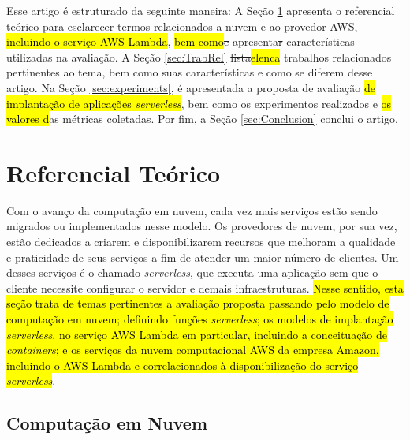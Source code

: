 \documentclass[10pt,conference]{IEEEtran}
\begin{document}
Esse artigo é estruturado da seguinte maneira: A Seção \ref{sec:RefTeo} apresenta o referencial teórico para esclarecer termos relacionados a nuvem e ao provedor AWS, \hl{incluindo o serviço AWS Lambda}, \hl{bem como}\st{e} apresenta\st{r} características utilizadas na avaliação. A Seção \ref{sec:TrabRel} \st{lista}\hl{elenca} trabalhos relacionados pertinentes ao tema, bem como suas características e como se diferem desse artigo. Na Seção \ref{sec:experiments}, é apresentada a proposta de avaliação \hl{de implantação de aplicações \textit{serverless}}, bem como os experimentos realizados e \hl{os valores d}as métricas coletadas. Por fim, a Seção \ref{sec:Conclusion} conclui o artigo.

\section{Referencial Teórico} 
\label{sec:RefTeo}

Com o avanço da computação em nuvem, cada vez mais serviços estão sendo migrados ou implementados nesse modelo. Os provedores de nuvem, por sua vez, estão dedicados a criarem e disponibilizarem recursos que melhoram a qualidade e praticidade de seus serviços a fim de atender um maior número de clientes. Um desses serviços é o chamado \textit{serverless}, que executa uma aplicação sem que o cliente necessite configurar o servidor e demais infraestruturas. \hl{Nesse sentido, esta seção trata de temas pertinentes a avaliação proposta passando pelo modelo de computação em nuvem; definindo funções \textit{serverless}; os modelos de implantação \textit{serverless}, no serviço AWS Lambda em particular, incluindo a conceituação de \textit{containers}; e os serviços da nuvem computacional AWS da empresa Amazon, incluindo o AWS Lambda e correlacionados à disponibilização do serviço \textit{serverless}}. %
    
\subsection{Computação em Nuvem}
\label{subsec:cloud}
\end{document}
